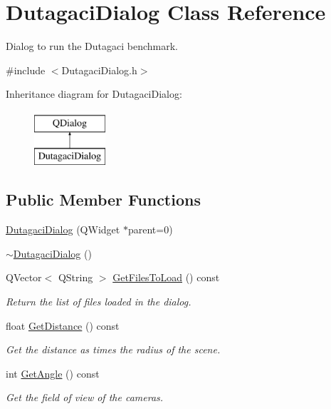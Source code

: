 \hypertarget{class_dutagaci_dialog}{\section{Dutagaci\+Dialog Class Reference}
\label{class_dutagaci_dialog}
}


Dialog to run the Dutagaci benchmark.  




{\ttfamily \#include $<$Dutagaci\+Dialog.\+h$>$}

Inheritance diagram for Dutagaci\+Dialog\+:\begin{figure}[H]
\begin{center}
\leavevmode
\includegraphics[height=2.000000cm]{class_dutagaci_dialog}
\end{center}
\end{figure}
\subsection*{Public Member Functions}
\begin{DoxyCompactItemize}
\item 
\hyperlink{class_dutagaci_dialog_a60ba64d79774ee46864dee12d8cd41cf}{Dutagaci\+Dialog} (Q\+Widget $\ast$parent=0)
\item 
\hyperlink{class_dutagaci_dialog_afc0b306a809090930a4646d2793b6eb3}{$\sim$\+Dutagaci\+Dialog} ()
\item 
Q\+Vector$<$ Q\+String $>$ \hyperlink{class_dutagaci_dialog_a133408f50e8890a5b7198790dfab153e}{Get\+Files\+To\+Load} () const 
\begin{DoxyCompactList}\small\item\em Return the list of files loaded in the dialog. \end{DoxyCompactList}\item 
float \hyperlink{class_dutagaci_dialog_a0ccfbc81cbfe1d47a1e0672981522df1}{Get\+Distance} () const 
\begin{DoxyCompactList}\small\item\em Get the distance as times the radius of the scene. \end{DoxyCompactList}\item 
int \hyperlink{class_dutagaci_dialog_afffe503535e80f9c2acaf9e47bff4d90}{Get\+Angle} () const 
\begin{DoxyCompactList}\small\item\em Get the field of view of the cameras. \end{DoxyCompactList}\end{DoxyCompactItemize}
